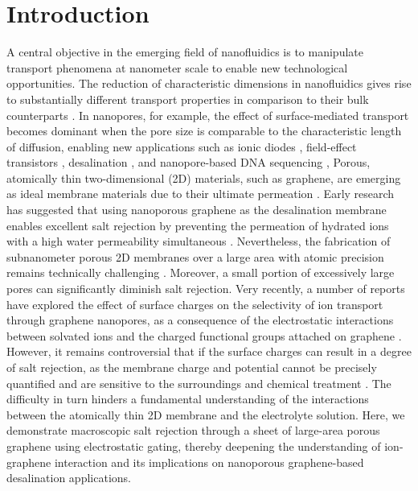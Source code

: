 \documentclass[journal=langd5,email=true, hyperref=true, keywords=false]{achemso}
\begin{document}
\section{Introduction}
\label{sec:intro}
A central objective in the emerging field of nanofluidics is to
manipulate transport phenomena at nanometer scale to enable new
technological opportunities. The reduction of characteristic
dimensions in nanofluidics gives rise to substantially different
transport properties in comparison to their bulk counterparts
\cite{Schoch_2008}. In nanopores, for example, the effect of
surface-mediated transport becomes dominant when the pore size is
comparable to the characteristic length of diffusion, enabling new
applications such as ionic diodes \cite{Karnik_2007}, field-effect
transistors \cite{Nam_2009}, desalination \cite{Heiranian_2015}, and
nanopore-based DNA sequencing \cite{Heerema_2016,Garaj_2013}, Porous,
atomically thin two-dimensional (2D) materials, such as graphene, are
emerging as ideal membrane materials due to their ultimate permeation
\cite{Suk_2010,Jiang_2009,Celebi_2014,Koenig_2012,Drahushuk_2012}. Early
research has suggested that using nanoporous graphene as the
desalination membrane enables excellent salt rejection by preventing
the permeation of hydrated ions with a high water permeability
simultaneous
\cite{Cohen_Tanugi_2012,Suk_2014,Cohen_Tanugi_2014,Cohen_Tanugi_2015,O_Hern_2014,O_Hern_2015,Surwade_2015,Walker_2017,Ghosh_2018}. Nevertheless,
the fabrication of subnanometer porous 2D membranes over a large area
with atomic precision remains technically challenging
\cite{Suk_2014,Rollings_2016,O_Hern_2012,Wang_2017}. Moreover, a small
portion of excessively large pores can significantly diminish salt
rejection.  Very recently, a number of reports have explored the
effect of surface charges on the selectivity of ion transport through
graphene nanopores, as a consequence of the electrostatic interactions
between solvated ions and the charged functional groups attached on
graphene \cite{Rollings_2016,Surwade_2014}. However, it remains
controversial that if the surface charges can result in a degree of
salt rejection, as the membrane charge and potential cannot be
precisely quantified and are sensitive to the surroundings and
chemical treatment \cite{Li_2008}. The difficulty in turn hinders a
fundamental understanding of the interactions between the atomically
thin 2D membrane and the electrolyte solution. Here, we demonstrate
macroscopic salt rejection through a sheet of large-area porous
graphene using electrostatic gating, thereby deepening the
understanding of ion-graphene interaction and its implications on
nanoporous graphene-based desalination applications.
\end{document}
